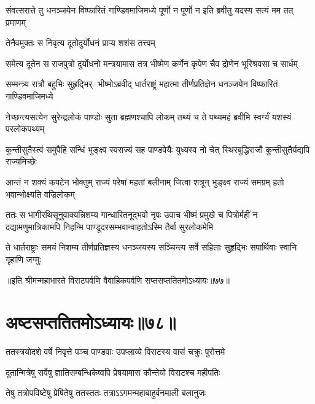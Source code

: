 \fourlineindentedshloka
{संवत्सरात्ते तु धनञ्जयेन}
{विष्फारितं गाण्डिवमाजिमध्ये}
{पूर्णो न पूर्णो न इति ब्रवीतु}
{यदस्य सत्यं मम तत् प्रमाणम्}


\onelineshloka
{तेनैवमुक्तः स निवृत्य दूतोदुर्योधनं प्राप्य शशंस तत्त्वम्}

\fourlineindentedshloka
{समेत्य दूतेन स राजपुत्रो}
{दुर्योधनो मन्त्रयामास तत्र}
{भीष्मेण कर्णेन कृपेण चैव}
{द्रोणेन भूरिश्रवसा च सार्धम्}


\fourlineindentedshloka
{सम्मन्त्र्य रात्रौ बहुभिः सुहृद्भिर्-}
{भीष्मोऽब्रवीद् धार्तराष्ट्रं महात्मा}
{तीर्णप्रतिज्ञेन धनञ्जयेन}
{विष्फारितं गाण्डिवमाजिमध्ये}



\fourlineindentedshloka
{नेच्छन्त्यसत्येन सुरेन्द्रलोकं}
{पाण्डोः सुता ब्रह्मणश्चापि लोकम्}
{तथ्यं च ते पथ्यमहं ब्रवीमि}
{स्वर्ग्यं यशस्यं परलोकपथ्यम्}


\fourlineindentedshloka
{कुन्तीसुतैस्त्वं समुपैहि सन्धिं}
{भुङ्क्ष्व स्वराज्यं सह पाण्डवेयैः}
{युध्यस्व नो चेत् स्थिरबुद्धिराजौ}
{कुन्तीसुतैर्यद्यपि राज्यमिच्छेः}


\fourlineindentedshloka
{आन्तं न शक्यं कपटेन भोक्तुम्}
{राज्यं परेषां महतां बलीनाम्}
{जित्वा शत्रून् भुङ्क्ष्व राज्यं समग्रम्}
{हतो भवान्भोक्ष्यति वज्रिलोकम्}



\threelineshloka
{ततः स भागीरथिसूनुवाक्यन्निशम्य गान्धारितनूद्भवो नृपः}
{उवाच भीष्मं प्रमुखे च पित्रोर्महीं न दद्यामणुमात्रिकामपि}
{निहन्मि पाण्डूदरसम्भवान्वाहतोऽस्मि तैर्वा सुरलोकमेमि}


\fourlineindentedshloka
{ते धार्तराष्ट्राः समयं निशम्य}
{तीर्णप्रतिज्ञस्य धनञ्जयस्य }
{सञ्चिन्त्य सर्वे सहिताः सुहृद्भिः}
{सपार्थिवाः स्वानि गृहाणि जग्मुः}

॥इति श्रीमन्महाभारते विराटपर्वणि वैवाहिकपर्वणि सप्तसप्ततितमोऽध्यायः॥७७॥

\chapter{अष्टसप्ततितमोऽध्यायः॥७८॥ }

\twolineshloka
{ततस्त्रयोदशे वर्षे निवृत्ते पञ्च पाण्डवाः}
{उपप्लाव्ये विराटस्य वासं चक्रुः पुरोत्तमे}


\twolineshloka
{दूतान्मित्रेषु सर्वेषु ज्ञातिसम्बन्धिकेष्वपि}
{प्रेषयामास कौन्तेयो विराटश्च महीपतिः}


\twolineshloka
{तेषु तत्रोपविष्टेषु प्रेषितेषु ततस्ततः}
{तत्राऽऽगमन्महाबाहुर्वनमाली बलानुजः}


